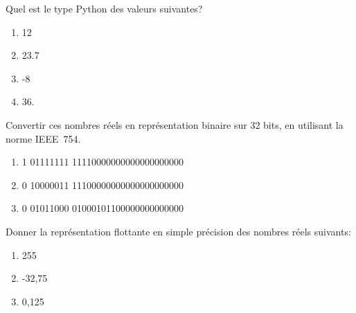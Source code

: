 \documentclass[a4paper,11pt]{article}
\begin{document}
\begin{Form}
\begin{exo}
Quel est le type Python des valeurs suivantes?
\begin{enumerate}
\item 12
\item 23.7
\item -8
\item 36.
\end{enumerate}
\end{exo}
\begin{exo}
Convertir ces nombres réels en représentation binaire sur 32 bits, en utilisant la norme IEEE~754.
\begin{enumerate}
\item 1 01111111 11110000000000000000000
\item 0 10000011 11100000000000000000000
\item 0 01011000 01000101100000000000000
\end{enumerate}
\end{exo}
\begin{exo}
Donner la représentation flottante en simple précision des nombres réels suivants:
\begin{enumerate}
\item 255
\item -32,75
\item 0,125
\end{enumerate}
\end{exo}
\end{Form}
\end{document}
